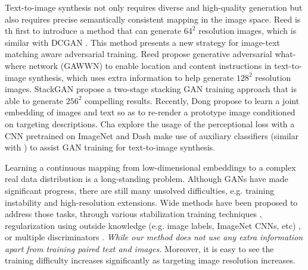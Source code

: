 \documentclass[10pt,twocolumn,letterpaper]{article}
\begin{document}
Text-to-image synthesis not only requires diverse and high-quality generation but also requires precise semantically consistent mapping in the image space.  Reed \etal \cite{reed2016generative}  is th first to introduce a method that can generate $64^2$ resolution images, which is similar with DCGAN \cite{radford2015unsupervised}. This method presents a new strategy for image-text matching aware adversarial training. Reed \etal \cite{reed2016learning} propose generative
adversarial what-where network (GAWWN) to enable location and content instructions in text-to-image synthesis, which uses extra information to help generate $128^2$ resolution images. StackGAN \etal \cite{han2017stackgan} propose a two-stage stacking GAN training approach that is able to generate $256^2$ compelling results. Recently, Dong \etal \cite{dong2017semantic} propose to learn a joint embedding of images and text so as to re-render a prototype image conditioned on targeting descriptions. Cha \etal \cite{char2017perceptual} explore the usage of the perceptional loss with a CNN pretrained on ImageNet \cite{johnson2016perceptual} and Dash \etal \cite{dash2017tac} make use of auxiliary classifiers (similar with \cite{odena2016conditional}) to assist GAN training for text-to-image synthesis. 
	
Learning a continuous mapping from low-dimensional embeddings to a complex real data distribution is a long-standing problem. Although GANs have made significant progress, there are still many  unsolved difficulties, e.g. training instability and high-resolution extensions. Wide methods have been proposed to address those tasks, through various stabilization training techniques \cite{salimans2016improved,arjovsky2017wasserstein,berthelot2017began,shrivastava2016learning,odena2016conditional}, regularization using outside knowledge (e.g. image labels, ImageNet CNNs, etc) \cite{dosovitskiy2016generating,ledig2016photo,dash2017tac,dash2017tac}, or multiple discriminators  \cite{metz2016unrolled,durugkar2016generative,yang2017lr}. \textit{While our method does not use any extra information apart from training paired text and images.} Moreover, it is easy to see the training difficulty increases significantly as targeting image resolution increases.

\end{document}
